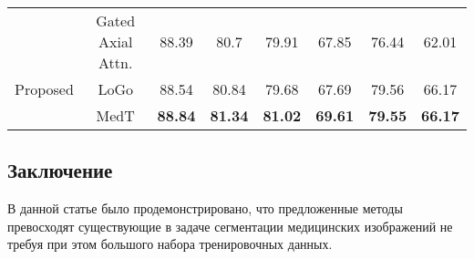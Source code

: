 {\begin{center}
\begin{tabular}{
    |c | c | c  c | c c | c c |}
& Gated Axial Attn.                                           & 88.39                           & 80.7                        & 79.91                     & 67.85                 & 76.44                      & 62.01                  \\
Proposed                                                           & LoGo                                                        & 88.54                           & 80.84                       & 79.68                     & 67.69                 & 79.56                      & 66.17                  \\
& MedT                                                        & \textbf{88.84}                           & \textbf{81.34}                       & \textbf{81.02}                     & \textbf{69.61}                 & \textbf{79.55}                      & \textbf{66.17}    \\ \hline             
\end{tabular}

    
\end{center}

}







\subsection*{Заключение}
В данной статье было продемонстрировано, что предложенные методы превосходят существующие 
в задаче сегментации медицинских изображений не требуя при этом большого набора тренировочных данных.





